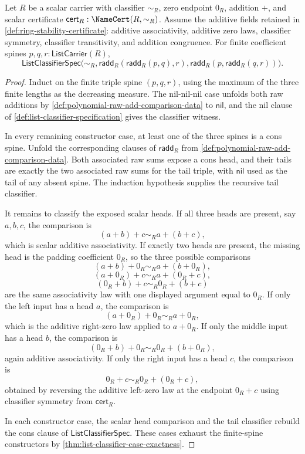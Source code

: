\begin{lemma}
\label{lem:polynomial-raw-add-structural-associativity}
Let $R$ be a scalar carrier with classifier $\sim_R$, zero endpoint $0_R$, addition $+$, and scalar certificate $\mathsf{cert}_R:\NameCert(R,\sim_R)$. Assume the additive fields retained in \autoref{def:ring-stability-certificate}: additive associativity, additive zero laws, classifier symmetry, classifier transitivity, and addition congruence. For finite coefficient spines $p,q,r:\mathsf{ListCarrier}(R)$,
$$
\mathsf{ListClassifierSpec}\bigl(\sim_R,
\mathsf{radd}_R(\mathsf{radd}_R(p,q),r),
\mathsf{radd}_R(p,\mathsf{radd}_R(q,r))\bigr).
$$
\end{lemma}
\begin{proof}
Induct on the finite triple spine $(p,q,r)$, using the maximum of the three finite lengths as the decreasing measure. The nil-nil-nil case unfolds both raw additions by \autoref{def:polynomial-raw-add-comparison-data} to $\mathsf{nil}$, and the nil clause of \autoref{def:list-classifier-specification} gives the classifier witness.

In every remaining constructor case, at least one of the three spines is a cons spine. Unfold the corresponding clauses of $\mathsf{radd}_R$ from \autoref{def:polynomial-raw-add-comparison-data}. Both associated raw sums expose a cons head, and their tails are exactly the two associated raw sums for the tail triple, with $\mathsf{nil}$ used as the tail of any absent spine. The induction hypothesis supplies the recursive tail classifier.

It remains to classify the exposed scalar heads. If all three heads are present, say $a,b,c$, the comparison is
$$
(a+b)+c\sim_R a+(b+c),
$$
which is scalar additive associativity. If exactly two heads are present, the missing head is the padding coefficient $0_R$, so the three possible comparisons
$$
(a+b)+0_R\sim_R a+(b+0_R),
$$
$$
(a+0_R)+c\sim_R a+(0_R+c),
$$
$$
(0_R+b)+c\sim_R 0_R+(b+c)
$$
are the same associativity law with one displayed argument equal to $0_R$. If only the left input has a head $a$, the comparison is
$$
(a+0_R)+0_R\sim_R a+0_R,
$$
which is the additive right-zero law applied to $a+0_R$. If only the middle input has a head $b$, the comparison is
$$
(0_R+b)+0_R\sim_R 0_R+(b+0_R),
$$
again additive associativity. If only the right input has a head $c$, the comparison is
$$
0_R+c\sim_R0_R+(0_R+c),
$$
obtained by reversing the additive left-zero law at the endpoint $0_R+c$ using classifier symmetry from $\mathsf{cert}_R$.

In each constructor case, the scalar head comparison and the tail classifier rebuild the cons clause of $\mathsf{ListClassifierSpec}$. These cases exhaust the finite-spine constructors by \autoref{thm:list-classifier-case-exactness}.
\end{proof}

